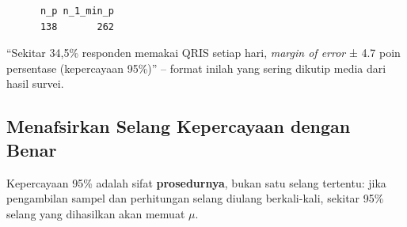 \documentclass[
  indonesian,
  letterpaper,
]{book}
\begin{document}
\begin{verbatim}
      n_p n_1_min_p 
      138       262 
\end{verbatim}

``Sekitar 34,5\% responden memakai QRIS setiap hari, \emph{margin of
error} ± 4.7 poin persentase (kepercayaan 95\%)'' -- format inilah yang
sering dikutip media dari hasil survei.

\subsection{Menafsirkan Selang Kepercayaan dengan
Benar}\label{menafsirkan-selang-kepercayaan-dengan-benar}

Kepercayaan 95\% adalah sifat \textbf{prosedurnya}, bukan satu selang
tertentu: jika pengambilan sampel dan perhitungan selang diulang
berkali-kali, sekitar 95\% selang yang dihasilkan akan memuat \(\mu\).
\end{document}
